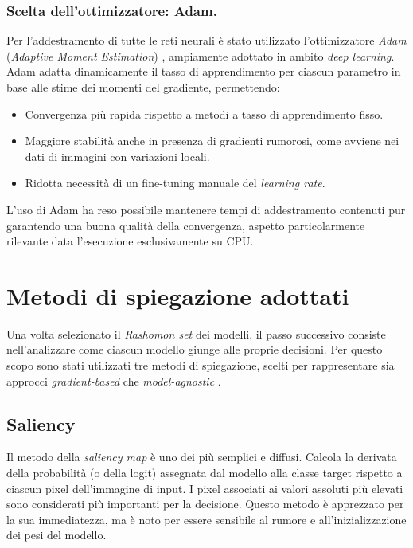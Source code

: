 \documentclass[12pt,a4paper,oneside]{report}
\numberwithin{figure}{chapter}
\numberwithin{table}{chapter}
\begin{document}
\subsection{Scelta dell’ottimizzatore: Adam.}
Per l’addestramento di tutte le reti neurali è stato utilizzato l’ottimizzatore
\emph{Adam} (\emph{Adaptive Moment Estimation}) \citep{kingma2014adam},
ampiamente adottato in ambito \emph{deep learning}. Adam adatta dinamicamente
il tasso di apprendimento per ciascun parametro in base alle stime dei momenti
del gradiente, permettendo:
\begin{itemize}
      \item Convergenza più rapida rispetto a metodi a tasso di apprendimento fisso.
      \item Maggiore stabilità anche in presenza di gradienti rumorosi, come avviene nei
            dati di immagini con variazioni locali.
      \item Ridotta necessità di un fine-tuning manuale del \emph{learning rate}.
\end{itemize}
L’uso di Adam ha reso possibile mantenere tempi di addestramento contenuti pur garantendo
una buona qualità della convergenza, aspetto particolarmente rilevante data
l’esecuzione esclusivamente su CPU.

\chapter{Metodi di spiegazione adottati}

Una volta selezionato il \emph{Rashomon set} dei modelli, il passo successivo
consiste nell’analizzare come ciascun modello giunge alle proprie decisioni.
Per questo scopo sono stati utilizzati tre metodi di spiegazione, scelti per
rappresentare sia approcci \emph{gradient-based} che \emph{model-agnostic}
\cite{adadi2018survey,guidotti2018survey}.

\section{Saliency}
Il metodo della \emph{saliency map} \cite{simonyan2013deep,samek2016evaluating}
è uno dei più semplici e diffusi. Calcola la derivata della probabilità (o
della logit) assegnata dal modello alla classe target rispetto a ciascun pixel
dell’immagine di input. I pixel associati ai valori assoluti più elevati sono
considerati più importanti per la decisione. Questo metodo è apprezzato per la
sua immediatezza, ma è noto per essere sensibile al rumore e
all’inizializzazione dei pesi del modello.
\end{document}

